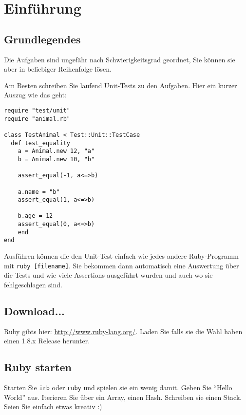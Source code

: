 \documentclass[a4paper,11pt,oneside]{scrbook}
\begin{document}
\renewcommand{\theequation}{\thesection.\arabic}
\setcapindent*{1em}


\chapter{Einführung} %
\label{cha:einführung}

\section{Grundlegendes} %
\label{sec:Grundlegendes}
Die Aufgaben sind ungefähr nach Schwierigkeitsgrad geordnet, Sie können sie aber in beliebiger Reihenfolge lösen.

Am Besten schreiben Sie laufend Unit-Tests zu den Aufgaben. Hier ein kurzer Auszug wie das geht:

\begin{lstlisting}
require "test/unit"
require "animal.rb"

class TestAnimal < Test::Unit::TestCase
  def test_equality
    a = Animal.new 12, "a"
    b = Animal.new 10, "b"
    
    assert_equal(-1, a<=>b)
    
    a.name = "b"
    assert_equal(1, a<=>b)
    
    b.age = 12
    assert_equal(0, a<=>b)
    end
end
\end{lstlisting}

Ausführen können die den Unit-Test einfach wie jedes andere Ruby-Programm mit \texttt{ruby [filename]}. Sie bekommen dann automatisch eine Auswertung über die Tests und wie viele Assertions ausgeführt wurden und auch wo sie fehlgeschlagen sind.




\section{Download...} %
\label{sec:download_}
Ruby gibts hier: \url{http://www.ruby-lang.org/}. Laden Sie falls sie die Wahl haben einen 1.8.x Release herunter.

\section{Ruby starten} %
\label{sec:ruby_starten}
Starten Sie \texttt{irb} oder \texttt{ruby} und spielen sie ein wenig damit. Geben Sie “Hello World” aus. Iterieren Sie über ein Array, einen Hash. Schreiben sie einen Stack. Seien Sie einfach etwas kreativ :)
\end{document}
